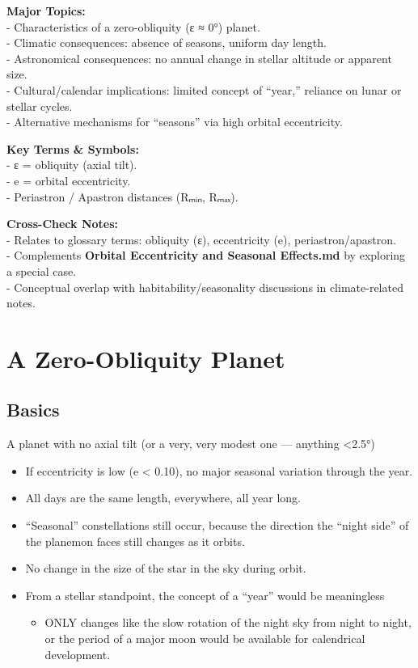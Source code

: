 \documentclass[
  letterpaper,
]{book}
\providecommand{\tightlist}{%
  \setlength{\itemsep}{0pt}\setlength{\parskip}{0pt}}
\begin{document}
\textbf{Major Topics:}\\
- Characteristics of a zero-obliquity (ε ≈ 0°) planet.\\
- Climatic consequences: absence of seasons, uniform day length.\\
- Astronomical consequences: no annual change in stellar altitude or
apparent size.\\
- Cultural/calendar implications: limited concept of ``year,'' reliance
on lunar or stellar cycles.\\
- Alternative mechanisms for ``seasons'' via high orbital eccentricity.

\textbf{Key Terms \& Symbols:}\\
- ε = obliquity (axial tilt).\\
- e = orbital eccentricity.\\
- Periastron / Apastron distances (Rₘᵢₙ, Rₘₐₓ).

\textbf{Cross-Check Notes:}\\
- Relates to glossary terms: obliquity (ε), eccentricity (e),
periastron/apastron.\\
- Complements \textbf{Orbital Eccentricity and Seasonal Effects.md} by
exploring a special case.\\
- Conceptual overlap with habitability/seasonality discussions in
climate-related notes.

\chapter{A Zero-Obliquity Planet}\label{a-zero-obliquity-planet}

\section{Basics}\label{basics}

A planet with no axial tilt (or a very, very modest one --- anything
\textless2.5°)

\begin{itemize}
\tightlist
\item
  If eccentricity is low (e \textless{} 0.10), no major seasonal
  variation through the year.
\item
  All days are the same length, everywhere, all year long.
\item
  ``Seasonal'' constellations still occur, because the direction the
  ``night side'' of the planemon faces still changes as it orbits.
\item
  No change in the size of the star in the sky during orbit.
\item
  From a stellar standpoint, the concept of a ``year'' would be
  meaningless

  \begin{itemize}
  \tightlist
  \item
    ONLY changes like the slow rotation of the night sky from night to
    night, or the period of a major moon would be available for
    calendrical development.
  \end{itemize}
\end{itemize}
\end{document}
